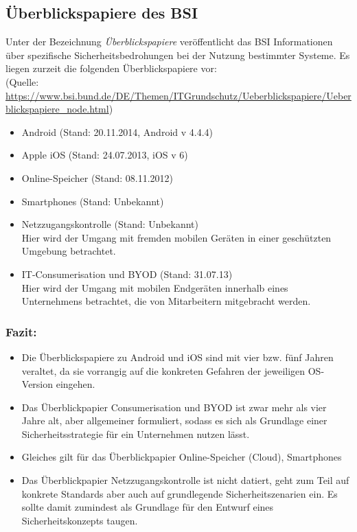 \subsection{Überblickspapiere des BSI}

Unter der Bezeichnung \emph{Überblickspapiere} veröffentlicht das BSI Informationen über spezifische Sicherheitsbedrohungen bei der Nutzung bestimmter Systeme. Es liegen zurzeit die folgenden Überblickspapiere vor:\\
(Quelle: \url{https://www.bsi.bund.de/DE/Themen/ITGrundschutz/Ueberblickspapiere/Ueberblickspapiere_node.html})

\begin{itemize}
	\item Android (Stand: 20.11.2014, Android v 4.4.4)
	\item Apple iOS (Stand: 24.07.2013, iOS v 6)
	\item Online-Speicher (Stand: 08.11.2012)
	\item Smartphones (Stand: Unbekannt)
	\item Netzzugangskontrolle (Stand: Unbekannt)\\
	Hier wird der Umgang mit fremden mobilen Geräten in einer geschützten Umgebung betrachtet.
	\item IT-Consumerisation und BYOD (Stand: 31.07.13)\\
	Hier wird der Umgang mit mobilen Endgeräten innerhalb eines Unternehmens betrachtet, die von Mitarbeitern mitgebracht werden.
\end{itemize}

\subsubsection{Fazit:}

\begin{itemize}
	\item Die Überblickspapiere zu Android und iOS sind mit vier bzw. fünf Jahren veraltet, da sie vorrangig auf die konkreten Gefahren der jeweiligen OS-Version eingehen.
	\item Das Überblickpapier Consumerisation und BYOD ist zwar mehr als vier Jahre alt, aber allgemeiner formuliert, sodass es sich als Grundlage einer Sicherheitsstrategie für ein Unternehmen nutzen lässt.
	\item Gleiches gilt für das Überblickpapier Online-Speicher (Cloud), Smartphones
	\item Das Überblickpapier Netzzugangskontrolle ist nicht datiert, geht zum Teil auf konkrete Standards aber auch auf grundlegende Sicherheitszenarien ein. Es sollte damit zumindest als Grundlage für den Entwurf eines Sicherheitskonzepts taugen.
\end{itemize}

